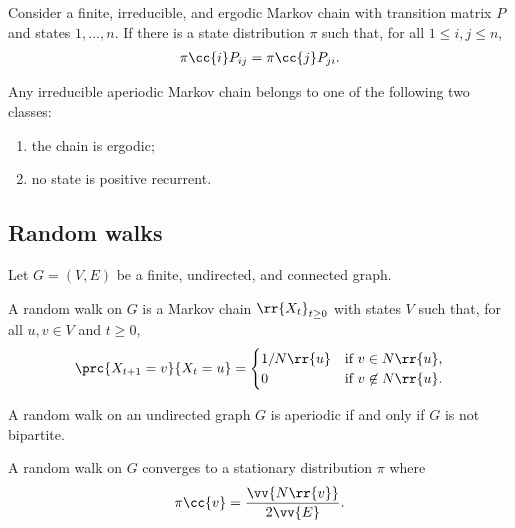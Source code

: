 \documentclass{article}
\begin{document}
\begin{theorem}
  Consider a finite, irreducible, and ergodic Markov chain with transition matrix
  $P$ and states ${1,...,n}$. If there is a state distribution $\pi$ such that, for all
  $1\leq i,j\leq n$,
  \begin{align*}
    \pi\cc{i}P_{ij} = \pi\cc{j}P_{ji}.
  \end{align*}
\end{theorem}

\begin{theorem}
  Any irreducible aperiodic Markov chain belongs to one of the following two classes:
  \begin{enumerate}
    \item the chain is ergodic;
    \item no state is positive recurrent.
  \end{enumerate}
\end{theorem}

\subsection{Random walks}

Let $G=(V,E)$ be a finite, undirected, and connected graph.

\begin{definition}
  A random walk on $G$ is a Markov chain $\rr{X_t}_{t\geq 0}$ with states $V$
  such that, for all $u,v\in V$ and $t\geq 0$,
  \begin{align*}
    \prc{X_{t+1}=v}{X_t=u} =
    \begin{cases}
      1/N\rr{u} & \text{if } v\in N\rr{u}, \\
      0         & \text{if }v\not\in N\rr{u}.
    \end{cases}
  \end{align*}
\end{definition}

\begin{lemma}
  A random walk on an undirected graph $G$ is aperiodic if and only if $G$ is not bipartite.
\end{lemma}

\begin{theorem}A random walk on $G$ converges to a stationary distribution $\pi$ where
  \begin{align*}
    \pi\cc{v}=\frac{\vv{N\rr{v}}}{2\vv{E}}.
  \end{align*}
\end{theorem}
\end{document}
